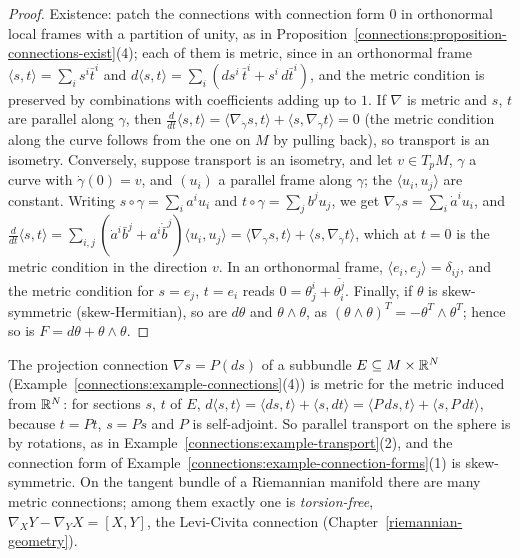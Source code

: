 \begin{proof}
Existence: patch the connections with connection form $0$ in orthonormal local frames with a partition of unity, as in Proposition~\ref{connections:proposition-connections-exist}(4); each of them is
metric, since in an orthonormal frame $\langle s, t\rangle = \sum_is^i\bar t^i$ and $d\langle s, t\rangle = \sum_i(ds^i\,\bar t^i + s^i\,d\bar t^i)$, and the metric condition is preserved by
combinations with coefficients adding up to $1$. If $\nabla$ is metric and $s$, $t$ are parallel along $\gamma$, then
$\frac{d}{dt}\langle s, t \rangle = \langle\nabla_{\dot\gamma}s, t\rangle + \langle s, \nabla_{\dot\gamma}t\rangle = 0$ (the metric condition along the curve follows from the one on $M$ by
pulling back), so transport is an isometry. Conversely, suppose transport is an isometry, and let $v \in T_pM$, $\gamma$ a curve with $\dot\gamma(0) = v$, and $(u_i)$ a parallel frame along $\gamma$; the
$\langle u_i, u_j\rangle$ are constant. Writing $s \circ \gamma = \sum_ia^iu_i$ and $t \circ \gamma = \sum_jb^ju_j$, we get $\nabla_{\dot\gamma}s = \sum_i\dot a^iu_i$, and
$\frac{d}{dt}\langle s, t\rangle = \sum_{i,j}(\dot a^i\bar b^j + a^i\dot{\bar b}^j)\langle u_i, u_j\rangle = \langle\nabla_{\dot\gamma}s, t\rangle + \langle s, \nabla_{\dot\gamma}t\rangle$, which at
$t = 0$ is the metric condition in the direction $v$. In an orthonormal frame, $\langle e_i, e_j\rangle = \delta_{ij}$, and the
metric condition for $s = e_j$, $t = e_i$ reads $0 = \theta^i_j + \overline{\theta^j_i}$. Finally, if $\theta$ is skew-symmetric (skew-Hermitian), so are $d\theta$ and
$\theta \wedge \theta$, as $(\theta \wedge \theta)^T = -\theta^T \wedge \theta^T$; hence so is $F = d\theta + \theta \wedge \theta$.
\end{proof}

\begin{example}\label{connections:example-metric-projection}
The projection connection $\nabla s = P(ds)$ of a subbundle $E \subseteq M \times \mathbb{R}^N$ (Example~\ref{connections:example-connections}(4)) is metric for the metric induced from $\mathbb{R}^N$:
for sections $s$, $t$ of $E$, $d\langle s, t\rangle = \langle ds, t\rangle + \langle s, dt\rangle = \langle P\,ds, t\rangle + \langle s, P\,dt\rangle$, because $t = Pt$, $s = Ps$ and $P$ is
self-adjoint. So parallel transport on the sphere is by rotations, as in Example~\ref{connections:example-transport}(2), and the connection form of
Example~\ref{connections:example-connection-forms}(1) is skew-symmetric. On the tangent bundle of a Riemannian manifold there are many metric connections; among them exactly one is
\emph{torsion-free}, $\nabla_XY - \nabla_YX = [X, Y]$, the Levi-Civita connection (Chapter~\ref{riemannian-geometry}).
\end{example}

